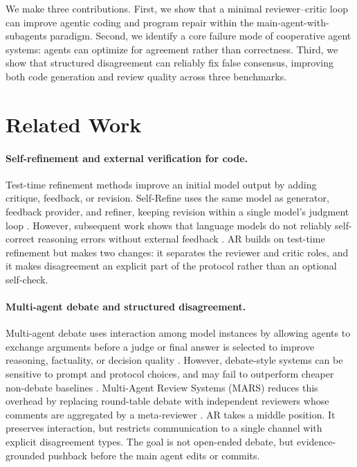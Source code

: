 \documentclass{article}
\begin{document}
We make three contributions. First, we show that a minimal reviewer--critic loop can improve agentic coding and program repair within the main-agent-with-subagents paradigm. Second, we identify a core failure mode of cooperative agent systems: agents can optimize for agreement rather than correctness. Third, we show that structured disagreement can reliably fix false consensus, improving both code generation and review quality across three benchmarks.

\section{Related Work}
\label{sec:related}

\paragraph{Self-refinement and external verification for code.}
Test-time refinement methods improve an initial model output by adding critique, feedback, or revision. Self-Refine uses the same model as generator, feedback provider, and refiner, keeping revision within a single model's judgment loop \citep{madaan2023self}. However, subsequent work shows that language models do not reliably self-correct reasoning errors without external feedback \citep{huang2024large}. AR builds on test-time refinement but makes two changes: it separates the reviewer and critic roles, and it makes disagreement an explicit part of the protocol rather than an optional self-check.

\paragraph{Multi-agent debate and structured disagreement.}
Multi-agent debate uses interaction among model instances by allowing agents to exchange arguments before a judge or final answer is selected to improve reasoning, factuality, or decision quality \citep{du2023mad,liang2024encouraging}. However, debate-style systems can be sensitive to prompt and protocol choices, and may fail to outperform cheaper non-debate baselines \citep{smit2023mad}. Multi-Agent Review Systems (MARS) reduces this overhead by replacing round-table debate with independent reviewers whose comments are aggregated by a meta-reviewer \citep{mars2025}. AR takes a middle position. It preserves interaction, but restricts communication to a single channel with explicit disagreement types. The goal is not open-ended debate, but evidence-grounded pushback before the main agent edits or commits.
\end{document}
